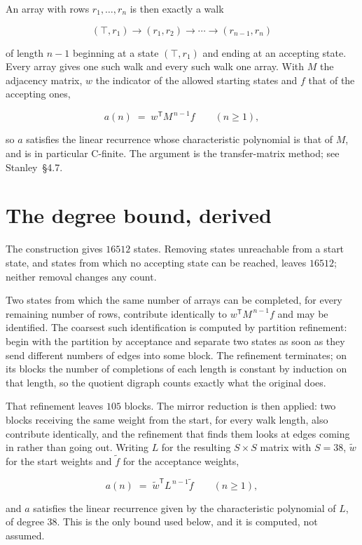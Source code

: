 \documentclass[11pt]{article}
\theoremstyle{definition}
\begin{document}
An array with rows $r_1,\dots,r_n$ is then exactly a walk

\[(\top,r_1) \to (r_1,r_2) \to \cdots \to (r_{n-1},r_n)\]

of length $n-1$ beginning at a state $(\top,r_1)$ and ending at an accepting state. Every array gives one such walk and every such walk one array. With $M$ the adjacency matrix, $w$ the indicator of the allowed starting states and $f$ that of the accepting ones,

\[a(n) \;=\; w^{\mathsf T} M^{\,n-1} f \qquad (n \ge 1),\]

so $a$ satisfies the linear recurrence whose characteristic polynomial is that of $M$, and is in particular C-finite. The argument is the transfer-matrix method; see Stanley~\S4.7.

\section{The degree bound, derived}

The construction gives $16512$ states. Removing states unreachable from a start state, and states from which no accepting state can be reached, leaves $16512$; neither removal changes any count.

Two states from which the same number of arrays can be completed, for every remaining number of rows, contribute identically to $w^{\mathsf T}M^{\,n-1}f$ and may be identified. The coarsest such identification is computed by partition refinement: begin with the partition by acceptance and separate two states as soon as they send different numbers of edges into some block. The refinement terminates; on its blocks the number of completions of each length is constant by induction on that length, so the quotient digraph counts exactly what the original does.

That refinement leaves $105$ blocks. The mirror reduction is then applied: two blocks receiving the same weight from the start, for every walk length, also contribute identically, and the refinement that finds them looks at edges coming in rather than going out. Writing $L$ for the resulting $S \times S$ matrix with $S = 38$, $\tilde w$ for the start weights and $\tilde f$ for the acceptance weights,

\[a(n) \;=\; \tilde w^{\mathsf T} L^{\,n-1} \tilde f \qquad (n \ge 1),\]

and $a$ satisfies the linear recurrence given by the characteristic polynomial of $L$, of degree $38$. This is the only bound used below, and it is computed, not assumed.
\end{document}
